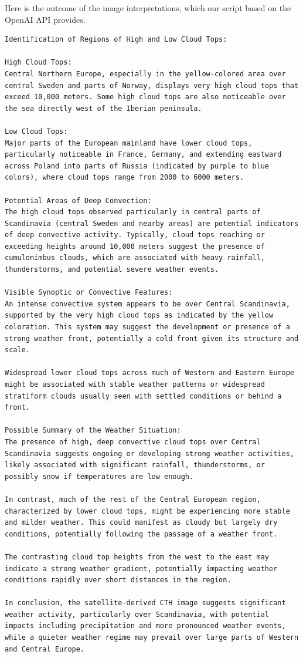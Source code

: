 Here is the outcome of the image interpretations, which our script based on the OpenAI API provides. 

\begin{lstlisting}[style=mdstyle]
Identification of Regions of High and Low Cloud Tops:

High Cloud Tops:
Central Northern Europe, especially in the yellow-colored area over central Sweden and parts of Norway, displays very high cloud tops that exceed 10,000 meters. Some high cloud tops are also noticeable over the sea directly west of the Iberian peninsula.

Low Cloud Tops:
Major parts of the European mainland have lower cloud tops, particularly noticeable in France, Germany, and extending eastward across Poland into parts of Russia (indicated by purple to blue colors), where cloud tops range from 2000 to 6000 meters.

Potential Areas of Deep Convection:
The high cloud tops observed particularly in central parts of Scandinavia (central Sweden and nearby areas) are potential indicators of deep convective activity. Typically, cloud tops reaching or exceeding heights around 10,000 meters suggest the presence of cumulonimbus clouds, which are associated with heavy rainfall, thunderstorms, and potential severe weather events.

Visible Synoptic or Convective Features:
An intense convective system appears to be over Central Scandinavia, supported by the very high cloud tops as indicated by the yellow coloration. This system may suggest the development or presence of a strong weather front, potentially a cold front given its structure and scale.

Widespread lower cloud tops across much of Western and Eastern Europe might be associated with stable weather patterns or widespread stratiform clouds usually seen with settled conditions or behind a front.

Possible Summary of the Weather Situation:
The presence of high, deep convective cloud tops over Central Scandinavia suggests ongoing or developing strong weather activities, likely associated with significant rainfall, thunderstorms, or possibly snow if temperatures are low enough.

In contrast, much of the rest of the Central European region, characterized by lower cloud tops, might be experiencing more stable and milder weather. This could manifest as cloudy but largely dry conditions, potentially following the passage of a weather front.

The contrasting cloud top heights from the west to the east may indicate a strong weather gradient, potentially impacting weather conditions rapidly over short distances in the region.

In conclusion, the satellite-derived CTH image suggests significant weather activity, particularly over Scandinavia, with potential impacts including precipitation and more pronounced weather events, while a quieter weather regime may prevail over large parts of Western and Central Europe.
\end{lstlisting}

